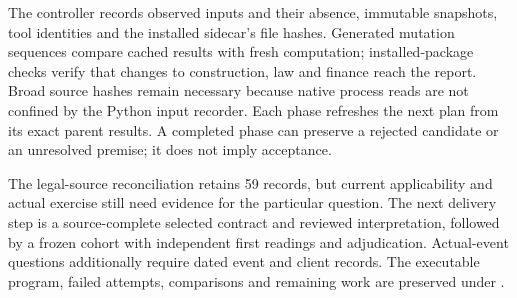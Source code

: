 The controller records observed inputs and their absence, immutable snapshots,
tool identities and the installed sidecar's file hashes. Generated mutation
sequences compare cached results with fresh computation; installed-package
checks verify that changes to construction, law and finance reach the report.
Broad source hashes remain necessary because native process reads are not
confined by the Python input recorder. Each phase refreshes the next plan from
its exact parent results. A completed phase can preserve a rejected candidate
or an unresolved premise; it does not imply acceptance.

The legal-source reconciliation retains 59 records, but current applicability
and actual exercise still need evidence for the particular question. The next
delivery step is a source-complete selected contract and reviewed interpretation,
followed by a frozen cohort with independent first readings and adjudication.
Actual-event questions additionally require dated event and client records.
The executable program, failed attempts, comparisons and remaining work are
preserved under .
